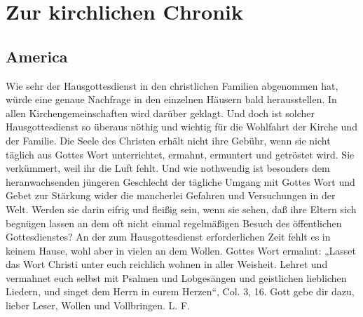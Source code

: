 \chapter{Zur kirchlichen Chronik}

\section{America}

Wie sehr der Hausgottesdienst in den christlichen Familien abgenommen hat, würde eine genaue Nachfrage in den einzelnen Häusern bald herausstellen. In allen Kirchengemeinschaften wird darüber geklagt. Und doch ist solcher Hausgottesdienst so überaus nöthig und wichtig für die Wohlfahrt der Kirche und der Familie. Die Seele des Christen erhält nicht ihre Gebühr, wenn sie nicht täglich aus Gottes Wort unterrichtet, ermahnt, ermuntert und getröstet wird. Sie verkümmert, weil ihr die Luft fehlt. Und wie nothwendig ist besonders dem heranwachsenden jüngeren Geschlecht der tägliche Umgang mit Gottes Wort und Gebet zur Stärkung wider die mancherlei Gefahren und Versuchungen in der Welt. Werden sie darin eifrig und fleißig sein, wenn sie sehen, daß ihre Eltern sich begnügen lassen an dem oft nicht einmal regelmäßigen Besuch des öffentlichen Gottesdienstes? An der zum Hausgottesdienst erforderlichen Zeit fehlt es in keinem Hause, wohl aber in vielen an dem Wollen. Gottes Wort ermahnt: „Lasset das Wort Christi unter euch reichlich wohnen in aller Weisheit. Lehret und vermahnet euch selbst mit Psalmen und Lobgesängen und geistlichen lieblichen Liedern, und singet dem Herrn in eurem Herzen“, Col. 3, 16. Gott gebe dir dazu, lieber Leser, Wollen und Vollbringen. L. F.

